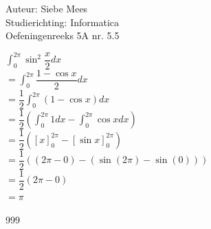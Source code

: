 \documentclass[a4paper]{article}
\begin{document}
  
\noindent \large Auteur: Siebe Mees \\
\noindent \large Studierichting: Informatica\\
\noindent \large Oefeningenreeks 5A nr. 5.5\\

\medskip

\normalsize

$ \displaystyle\int_{0}^{2\pi} \sin^2 \dfrac{x}{2} dx $\\

$ = \displaystyle\int_{0}^{2\pi} \dfrac{1 - \cos x}{2} dx $\\

$ = \dfrac{1}{2}\displaystyle\int_{0}^{2\pi} (1 - \cos x) dx $\\

$ = \dfrac{1}{2}\left( \displaystyle\int_{0}^{2\pi} 1dx - \displaystyle\int_{0}^{2\pi} \cos x dx \right) $\\

$ = \dfrac{1}{2}\left( \left[ x \right]_{0}^{2\pi} - \left[ \sin x \right]_{0}^{2\pi} \right) $\\

$ = \dfrac{1}{2}\left( (2\pi - 0) - (\sin(2\pi) - \sin(0)) \right) $\\

$ = \dfrac{1}{2}(2\pi - 0) $\\

$ = \pi $\\

\begin{thebibliography}{999}
\end{thebibliography}
\end{document}
